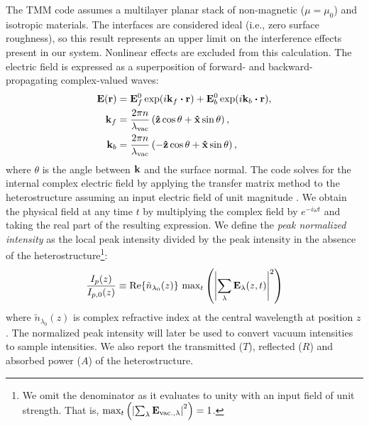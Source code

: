 The TMM code assumes a multilayer planar stack of non-magnetic ($\mu = \mu_0$) and isotropic materials. The interfaces are considered ideal (i.e., zero surface roughness), so this result represents an upper limit on the interference effects present in our system. Nonlinear effects are excluded from this calculation. The electric field is expressed as a superposition of forward- and backward-propagating complex-valued waves:
\begin{equation}
\begin{aligned}
\vb{E}(\vb{r}) &= \vb{E}_f^0 \exp(i \vb{k}_f \vdot \vb{r}) + \vb{E}_b^0 \exp(i \vb{k}_b \vdot \vb{r}), \\
\vb{k}_f &= \frac{2 \pi n}{\lambda_{\textrm{vac}}} \left( \vu{z} \cos \theta + \vu{x} \sin \theta \right), \\
\vb{k}_b &= \frac{2 \pi n}{\lambda_{\textrm{vac}}} \left( - \vu{z} \cos \theta + \vu{x} \sin \theta \right),
\end{aligned}
\end{equation}
where $\theta$ is the angle between $\vb{k}$ and the surface normal. The code solves for the internal complex electric field by applying the transfer matrix method to the heterostructure assuming an input electric field of unit magnitude \cite{nistadCausalityElectromagneticProperties2008,harbeckeCoherentIncoherentReflection1986,ohtaMatrixFormalismCalculation1990,katsidisGeneralTransfermatrixMethod2002,shalabneyElectromagneticFieldsDistribution2010}. We obtain the physical field at any time $t$ by multiplying the complex field by $e^{-i \omega t}$ and taking the real part of the resulting expression. We define the \textit{peak normalized intensity} as the local peak intensity divided by the peak intensity in the absence of the heterostructure\footnote{We omit the denominator as it evaluates to unity with an input field of unit strength. That is, $\textrm{max}_{t}\left( \left|\sum_{\lambda}\vb{E}_{\textrm{vac.},\lambda}\right|^2 \right) = 1$.}:
\begin{equation}
\frac{I_p(z)}{I_{p,0}(z)} \equiv \Re{\tilde{n}_{\lambda_0}(z)} \ \textrm{max}_{t}\left(\left|\sum_{\lambda}\vb{E}_\lambda(z, t)\right|^2 \right)
\end{equation}
where $\tilde{n}_{\lambda_0}(z)$ is complex refractive index at the central wavelength at position $z$. The normalized peak intensity will later be used to convert vacuum intensities to sample intensities. We also report the transmitted ($T$), reflected ($R$) and absorbed power ($A$) of the heterostructure.

